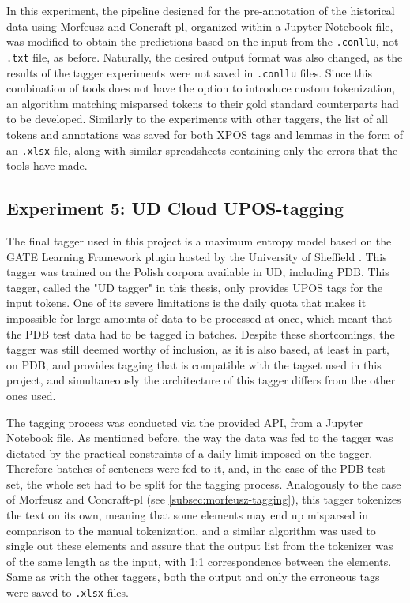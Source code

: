 In this experiment, the pipeline designed for the pre-annotation of the historical data using Morfeusz and Concraft-pl, organized within a Jupyter Notebook file, was modified to obtain the predictions based on the input from the \texttt{.conllu}, not \texttt{.txt} file, as before. Naturally, the desired output format was also changed, as the results of the tagger experiments were not saved in \texttt{.conllu} files. Since this combination of tools does not have the option to introduce custom tokenization, an algorithm matching misparsed tokens to their gold standard counterparts had to be developed. Similarly to the experiments with other taggers, the list of all tokens and annotations was saved for both XPOS tags and lemmas in the form of an \texttt{.xlsx} file, along with similar spreadsheets containing only the errors that the tools have made.

\subsection{Experiment 5: UD Cloud UPOS-tagging}
\label{subsec:ud-tagging}

The final tagger used in this project is a maximum entropy model based on the GATE Learning Framework plugin hosted by the University of Sheffield \citep{gatecloud}. This tagger was trained on the Polish corpora available in UD, including PDB. This tagger, called the "UD tagger" in this thesis, only provides UPOS tags for the input tokens. One of its severe limitations is the daily quota that makes it impossible for large amounts of data to be processed at once, which meant that the PDB test data had to be tagged in batches. Despite these shortcomings, the tagger was still deemed worthy of inclusion, as it is also based, at least in part, on PDB, and provides tagging that is compatible with the tagset used in this project, and simultaneously the architecture of this tagger differs from the other ones used.

The tagging process was conducted via the provided API, from a Jupyter Notebook file. As mentioned before, the way the data was fed to the tagger was dictated by the practical constraints of a daily limit imposed on the tagger. Therefore batches of sentences were fed to it, and, in the case of the PDB test set, the whole set had to be split for the tagging process. Analogously to the case of Morfeusz and Concraft-pl (see \autoref{subsec:morfeusz-tagging}), this tagger tokenizes the text on its own, meaning that some elements may end up misparsed in comparison to the manual tokenization, and a similar algorithm was used to single out these elements and assure that the output list from the tokenizer was of the same length as the input, with 1:1 correspondence between the elements. Same as with the other taggers, both the output and only the erroneous tags were saved to \texttt{.xlsx} files.

